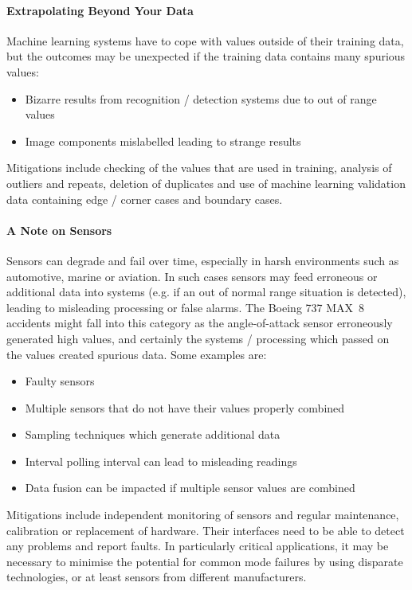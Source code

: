\paragraph{Extrapolating Beyond Your Data}
Machine learning systems have to cope with values outside of their training data, but the outcomes may be unexpected if the training data contains many spurious values:
\begin{itemize}
    \item Bizarre results from recognition / detection systems due to out of range values
    \item Image components mislabelled leading to strange results
\end{itemize}

Mitigations include checking of the values that are used in training, analysis of outliers and repeats, deletion of duplicates and use of machine learning validation data containing edge / corner cases and boundary cases.

\paragraph{A Note on Sensors}
Sensors can degrade and fail over time, especially in harsh environments such as automotive, marine or aviation. In such cases sensors may feed erroneous or additional data into systems (e.g. if an out of normal range situation is detected), leading to misleading processing or false alarms. The Boeing 737 MAX~8 accidents might fall into this category as the angle-of-attack sensor erroneously generated high values, and certainly the systems / processing which passed on the values created spurious data. Some examples are:
\begin{itemize}
    \item Faulty sensors
    \item Multiple sensors that do not have their values properly combined
    \item Sampling techniques which generate additional data
    \item Interval polling interval can lead to misleading readings
    \item Data fusion can be impacted if multiple sensor values are combined
\end{itemize}

Mitigations include independent monitoring of sensors and regular maintenance, calibration or replacement of hardware. Their interfaces need to be able to detect any problems and report faults. In particularly critical applications, it may be necessary to minimise the potential for common mode failures by using disparate technologies, or at least sensors from different manufacturers.

